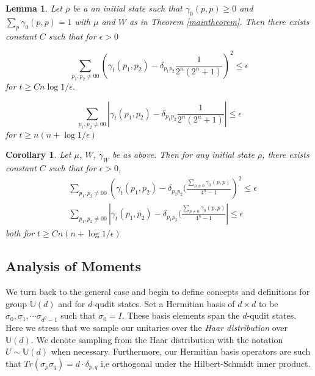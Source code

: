 \documentclass[12pt]{amsart}
\newtheorem{corollary}{Corollary}[theorem]
\newtheorem{lemma}[theorem]{Lemma}
\theoremstyle{definition}
\theoremstyle{remark}
\numberwithin{equation}{section}
\theoremstyle{remark}
\begin{document}
%
\begin{lemma}
  Let $\rho$ be a an initial state such that $\gamma_0(p,p) \geq 0$ and $\sum_{p} \gamma_0(p,p) = 1$ with $\mu$ and $W$ as in Theorem \ref{maintheorem}. Then there exists constant $C$ such that for $\epsilon > 0$

  \begin{equation}
    \sum_{p_1,p_2 \neq 00} \left( \gamma_t(p_1,p_2) - \delta_{p_1p_2} \frac{1}{2^n(2^n + 1)} \right)^2 \leq \epsilon
  \end{equation}
  for $t \geq Cn\log 1/\epsilon$.

  \begin{equation}
    \sum_{p_1,p_2 \neq 00} \left| \gamma_t(p_1,p_2) - \delta_{p_1p_2} \frac{1}{2^n(2^n + 1)} \right| \leq \epsilon
  \end{equation}
  for $t \geq n(n + \log 1/\epsilon)$
\end{lemma}

\begin{corollary}
  Let $\mu$, $W$, $\gamma_W$ be as above. Then for \emph{any} initial state $\rho$, there exists constant $C$ such that for $\epsilon > 0$,
  \begin{align}
    & \sum_{p_1,p_2 \neq 00} \left( \gamma_t(p_1,p_2) - \delta_{p_1p_2}(\frac{\sum_{p\neq 0} \gamma_0(p,p)}{4^n - 1} \right)^2 \leq \epsilon \\
    & \sum_{p_1,p_2 \neq 00} \left| \gamma_t(p_1,p_2) - \delta_{p_1p_2}(\frac{\sum_{p\neq 0} \gamma_0(p,p)}{4^n - 1} \right| \leq \epsilon
  \end{align}
  both for $t \geq Cn(n + \log 1/ \epsilon)$
\end{corollary}

\subsection{Analysis of Moments}

We turn back to the general case and begin to define concepts and definitions for group $\mathbb{U}(d)$ and for $d$-qudit states. Set a Hermitian basis of $d \times d$ to be $\sigma_0,\sigma_1,\cdots \sigma_{d^2 -1}$ such that $\sigma_0 = I$. These basis elements span the $d$-qudit states. Here we stress that we sample our unitaries over the \emph{Haar distribution} over $\mathbb{U}(d)$. We denote sampling from the Haar distribution with the notation $U \sim \mathbb{U}(d)$ when necessary. Furthermore, our Hermitian basis operators are such that $Tr(\sigma_p\sigma_q) = d \cdot \delta_{p,q}$ i,e orthogonal under the Hilbert-Schmidt inner product. \newline
\end{document}
